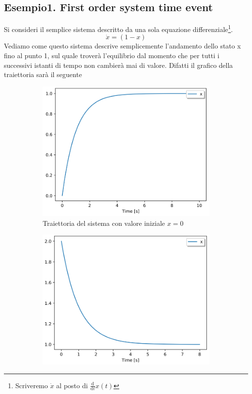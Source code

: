 \subsection*{Esempio1. First order system time event}
Si consideri il semplice sistema descritto da una sola equazione differenziale\footnote{Scriveremo $\dot{x}$ al posto di $\frac{\mathrm{d}}{\mathrm{d}t}x(t)$}.
\begin{equation}
    \dot{x} = (1 - x)
\end{equation}
Vediamo come questo sistema descrive semplicemente l'andamento dello stato x fino al punto 1, sul quale troverà l'equilibrio dal momento che per tutti i successivi istanti di tempo non cambierà mai di valore. Difatti il grafico della traiettoria sarà il seguente\\
\begin{figure}[h]
    \centering
    \begin{subfigure}[b]{0.4\textwidth}
        \includegraphics[width=\textwidth]{Intro/FirstOrderSystem_a.png}
        \caption{Traiettoria del sistema con valore iniziale $x=0$}
        \label{fig:my_label}
    \end{subfigure}
    \begin{subfigure}[b]{0.4\textwidth}
        \includegraphics[width=\textwidth]{Intro/FirstOrderSystem_b.png}

\end{subfigure}
\end{figure}
